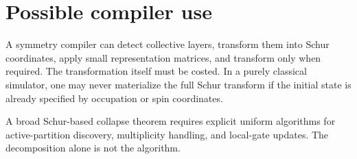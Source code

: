 \section{Possible compiler use}
A symmetry compiler can detect collective layers, transform them into Schur coordinates, apply small representation matrices, and transform only when required. The transformation itself must be costed. In a purely classical simulator, one may never materialize the full Schur transform if the initial state is already specified by occupation or spin coordinates.

\begin{frontierbox}
A broad Schur-based collapse theorem requires explicit uniform algorithms for active-partition discovery, multiplicity handling, and local-gate updates. The decomposition alone is not the algorithm.
\end{frontierbox}
